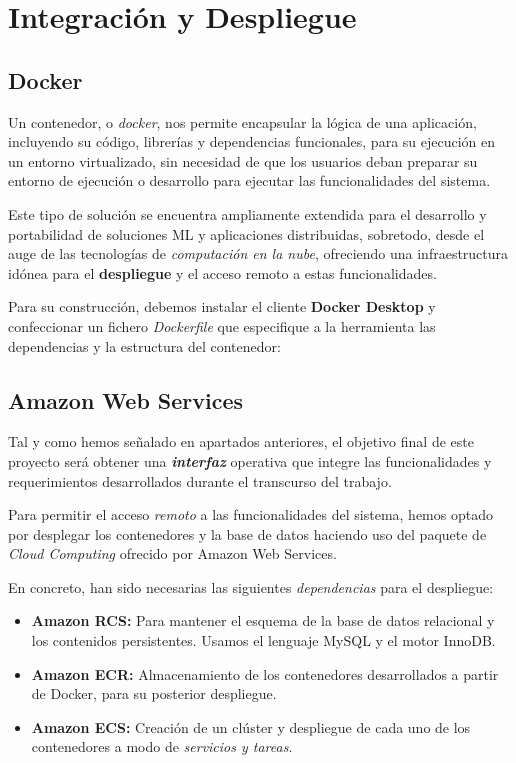  \section{Integración y Despliegue}

 \subsection{Docker}

 Un contenedor, o \textit{docker}, nos permite encapsular la lógica de una aplicación, incluyendo su código, librerías y dependencias funcionales, para su ejecución en un entorno virtualizado, sin necesidad de que los usuarios deban preparar su entorno de ejecución o desarrollo para ejecutar las funcionalidades del sistema.

 Este tipo de solución se encuentra ampliamente extendida para el desarrollo y portabilidad de soluciones ML y aplicaciones distribuidas, sobretodo, desde el auge de las tecnologías de \textit{computación en la nube}, ofreciendo una infraestructura idónea para el \textbf{despliegue} y el acceso remoto a estas funcionalidades.

 Para su construcción, debemos instalar el cliente \textbf{Docker Desktop} y confeccionar un fichero \textit{Dockerfile} que especifique a la herramienta las dependencias y la estructura del contenedor:



\subsection{Amazon Web Services}

Tal y como hemos señalado en apartados anteriores,  el objetivo final de este proyecto será obtener una \textit{\textbf{interfaz}} operativa que integre las funcionalidades y requerimientos desarrollados durante el transcurso del trabajo.

Para permitir el acceso \textit{remoto} a las funcionalidades del sistema, hemos optado por desplegar los contenedores y la base de datos haciendo uso del paquete de \textit{Cloud Computing} ofrecido por Amazon Web Services.

En concreto, han sido necesarias las siguientes \textit{dependencias} para el despliegue:

\begin{itemize}
    \item \textbf{Amazon RCS:} Para mantener el esquema de la base de datos relacional y los contenidos persistentes. Usamos el lenguaje MySQL y el motor InnoDB.
    \item \textbf{Amazon ECR:} Almacenamiento de los contenedores desarrollados a partir de Docker, para su posterior despliegue.
    \item \textbf{Amazon ECS:} Creación de un clúster y despliegue de cada uno de los contenedores a modo de \textit{servicios y tareas}.
\end{itemize}





